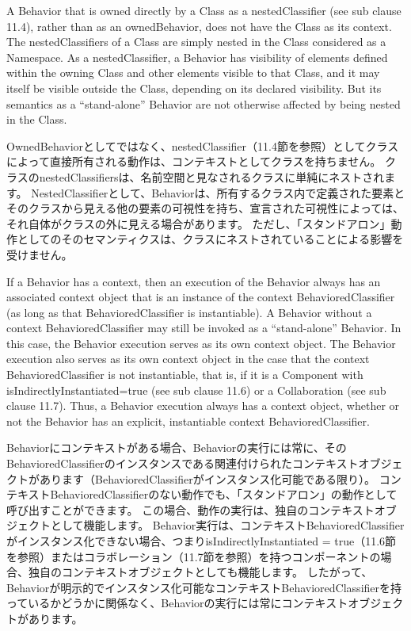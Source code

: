 \documentclass[a4paper,11pt]{ltjsarticle}
\begin{document}
A Behavior that is owned directly by a Class as a nestedClassifier (see sub clause 11.4), rather than as an ownedBehavior, does not have the Class as its context. 
The nestedClassifiers of a Class are simply nested in the Class considered as a Namespace. 
As a nestedClassifier, a Behavior has visibility of elements defined within the owning Class and other elements visible to that Class, and it may itself be visible outside the Class, depending on its declared visibility. 
But its semantics as a “stand-alone” Behavior are not otherwise affected by being nested in the Class.

OwnedBehaviorとしてではなく、nestedClassifier（11.4節を参照）としてクラスによって直接所有される動作は、コンテキストとしてクラスを持ちません。
クラスのnestedClassifiersは、名前空間と見なされるクラスに単純にネストされます。
NestedClassifierとして、Behaviorは、所有するクラス内で定義された要素とそのクラスから見える他の要素の可視性を持ち、宣言された可視性によっては、それ自体がクラスの外に見える場合があります。
ただし、「スタンドアロン」動作としてのそのセマンティクスは、クラスにネストされていることによる影響を受けません。

If a Behavior has a context, then an execution of the Behavior always has an associated context object that is an instance of the context BehavioredClassifier (as long as that BehavioredClassifier is instantiable). 
A Behavior without a context BehavioredClassifier may still be invoked as a “stand-alone” Behavior. 
In this case, the Behavior execution serves as its own context object. The Behavior execution also serves as its own context object in the case that the context BehavioredClassifier is not instantiable, that is, if it is a Component with isIndirectlyInstantiated=true (see sub clause 11.6) or a Collaboration (see sub clause 11.7). 
Thus, a Behavior execution always has a context object, whether or not the Behavior has an explicit, instantiable context BehavioredClassifier.

Behaviorにコンテキストがある場合、Behaviorの実行には常に、そのBehavioredClassifierのインスタンスである関連付けられたコンテキストオブジェクトがあります（BehavioredClassifierがインスタンス化可能である限り）。
コンテキストBehavioredClassifierのない動作でも、「スタンドアロン」の動作として呼び出すことができます。
この場合、動作の実行は、独自のコンテキストオブジェクトとして機能します。 Behavior実行は、コンテキストBehavioredClassifierがインスタンス化できない場合、つまりisIndirectlyInstantiated = true（11.6節を参照）またはコラボレーション（11.7節を参照）を持つコンポーネントの場合、独自のコンテキストオブジェクトとしても機能します。
したがって、Behaviorが明示的でインスタンス化可能なコンテキストBehavioredClassifierを持っているかどうかに関係なく、Behaviorの実行には常にコンテキストオブジェクトがあります。
\end{document}

